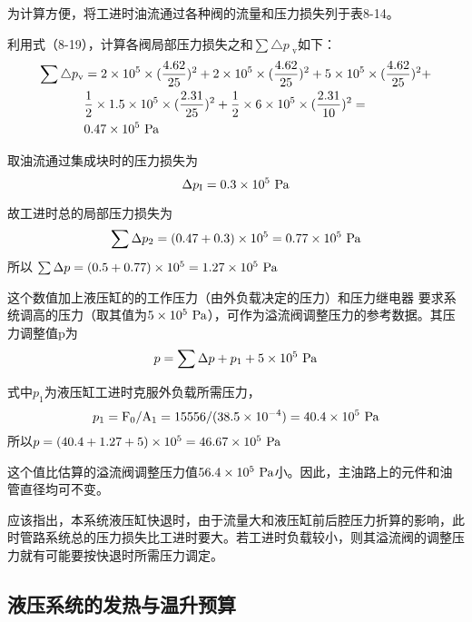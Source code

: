 为计算方便，将工进时油流通过各种阀的流量和压力损失列于表8-14。

\noindent 利用式（8-19），计算各阀局部压力损失之和$\sum \triangle p_\text{ v}$如下：
\[
\begin{split}
\sum \triangle p_\text{v}  & = 2\times10^5\times(\frac{4.62}{25})^2+2\times10^5\times(\frac{4.62}{25})^2+5\times10^5\times(\frac{4.62}{25})^2+\\ & \frac{1}{2}\times1.5\times10^5\times(\frac{2.31}{25})^2+\frac{1}{2}\times6\times10^5\times(\frac{2.31}{10})^2 =\\
&0.47\times10^5\rm \ Pa
\end{split}
\]

取油流通过集成块时的压力损失为
\[
\Delta p_\text{I}=0.3\times10^5\rm \ Pa
\]

故工进时总的局部压力损失为
\[
\sum \Delta p_2 =(0.47+0.3)\times10^5 = 0.77\times10^5\rm \ Pa
\]
所以 $\sum \Delta p =(0.5+0.77)\times10^5 = 1.27\times10^5\rm \ Pa$

这个数值加上液压缸的的工作压力（由外负载决定的压力）和压力继电器                                                                                                                                                                                                                                                                                                                                                                                                                                                                                                                                                                          要求系统调高的压力（取其值为$5\times10^5\rm \ Pa$），可作为溢流阀调整压力的参考数据。其压力调整值p为
\[
p=\sum\Delta p+p_1+5\times10^5\rm \ Pa
\]

\noindent 式中$p_1$为液压缸工进时克服外负载所需压力，
\[
p_1=\rm F_0/A_1=15556/(38.5\times10^{-4})=40.4\times10^5\ \rm Pa
\]
所以$p=(40.4+1.27+5)\times10^5=46.67\times10^5\ \rm Pa$

这个值比估算的溢流阀调整压力值$56.4\times10^5\ \rm Pa$小。因此，主油路上的元件和油管直径均可不变。

应该指出，本系统液压缸快退时，由于流量大和液压缸前后腔压力折算的影响，此时管路系统总的压力损失比工进时要大。若工进时负载较小，则其溢流阀的调整压力就有可能要按快退时所需压力调定。

\subsection{液压系统的发热与温升预算}

